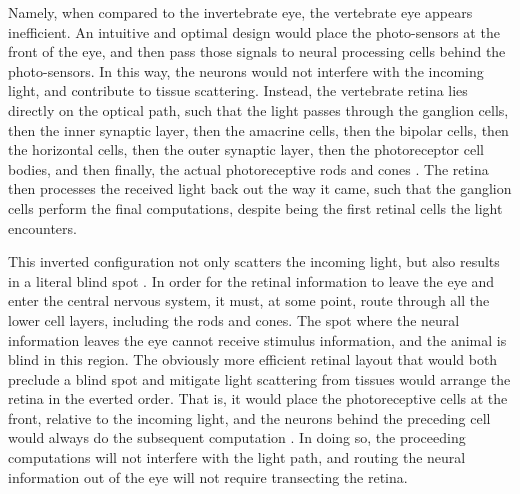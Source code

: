 \documentclass[twocolumn]{article}
\begin{document}
Namely, when compared to the invertebrate eye, the vertebrate eye appears inefficient. An intuitive and optimal design would place the photo-sensors at the front of the eye, and then pass those signals to neural processing cells behind the photo-sensors. In this way, the neurons would not interfere with the incoming light, and contribute to tissue scattering. Instead, the vertebrate retina lies directly on the optical path, such that the light passes through the ganglion cells, then the inner synaptic layer, then the amacrine cells, then the bipolar cells, then the horizontal cells, then the outer synaptic layer, then the photoreceptor cell bodies, and then finally, the actual photoreceptive rods and cones \cite{sterling_laughlin_principles, land_nilsson_2012}. The retina then processes the received light back out the way it came, such that the ganglion cells perform the final computations, despite being the first retinal cells the light encounters. 

This inverted configuration not only scatters the incoming light, but also results in a literal blind spot \cite{land_nilsson_2012}. In order for the retinal information to leave the eye and enter the central nervous system, it must, at some point, route through all the lower cell layers, including the rods and cones. The spot where the neural information leaves the eye cannot receive stimulus information, and the animal is blind in this region. The obviously more efficient retinal layout that would both preclude a blind spot and mitigate light scattering from tissues would arrange the retina in the everted order. That is, it would place the photoreceptive cells at the front, relative to the incoming light, and the neurons behind the preceding cell would always do the subsequent computation \cite{land_nilsson_2012}. In doing so, the proceeding computations will not interfere with the light path, and routing the neural information out of the eye will not require transecting the retina. 
\end{document}
